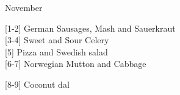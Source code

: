 		\begin{menu}{November}
    
    \begin{recipelist}
    
        {\scriptsize[1-2]} German Sausages, Mash and Sauerkraut\\
        {\scriptsize[3-4]} Sweet and Sour Celery\\
        {\scriptsize[5]} Pizza and Swedish salad\\
        {\scriptsize[6-7]} Norwegian Mutton and Cabbage\\%
    \end{recipelist}%
    \begin{recipelist}
    
        {\scriptsize[8-9]} Coconut dal\\
    \end{recipelist}\par%
  

\end{menu}
